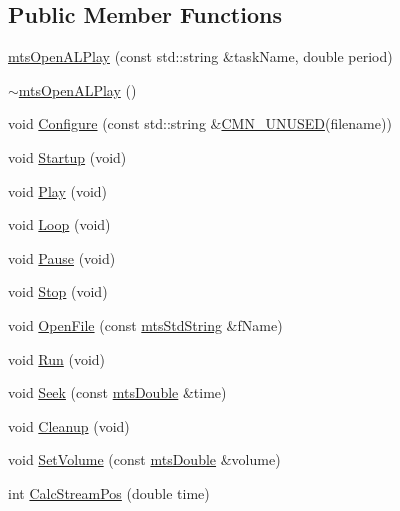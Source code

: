 \subsection*{Public Member Functions}
\begin{DoxyCompactItemize}
\item 
\hyperlink{classmts_open_a_l_play_a8e3527efa2c1a03b3731b021b1014d45}{mts\-Open\-A\-L\-Play} (const std\-::string \&task\-Name, double period)
\item 
\hyperlink{classmts_open_a_l_play_a4cfd60bc8e3b374965a64efe849ea293}{$\sim$mts\-Open\-A\-L\-Play} ()
\item 
void \hyperlink{classmts_open_a_l_play_a50d5e6a0d10ed9ce6731610c8a90348d}{Configure} (const std\-::string \&\hyperlink{cmn_portability_8h_a021894e2626935fa2305434b1e893ff6}{C\-M\-N\-\_\-\-U\-N\-U\-S\-E\-D}(filename))
\item 
void \hyperlink{classmts_open_a_l_play_ad4768ed94873e5be69d2ecaa193d107d}{Startup} (void)
\item 
void \hyperlink{classmts_open_a_l_play_acaaddecf2b42166c43cc70a2dcb30979}{Play} (void)
\item 
void \hyperlink{classmts_open_a_l_play_a636e6ddc634dc16bd49f2eebd992addc}{Loop} (void)
\item 
void \hyperlink{classmts_open_a_l_play_a488f3c12f12b5b0958cde0a881bde27c}{Pause} (void)
\item 
void \hyperlink{classmts_open_a_l_play_a96a4fef394cc593f4bb04a4cfb35fa4a}{Stop} (void)
\item 
void \hyperlink{classmts_open_a_l_play_af255131cd0ce646d98776c1d1d3b9992}{Open\-File} (const \hyperlink{mts_generic_object_proxy_8h_adbc21bfbf98367e582bf8a263b7e711f}{mts\-Std\-String} \&f\-Name)
\item 
void \hyperlink{classmts_open_a_l_play_a2c0ee1fd77ccb0b7e67767aee82cd164}{Run} (void)
\item 
void \hyperlink{classmts_open_a_l_play_ac02d0cc13bd81a096a65e491b1f48b33}{Seek} (const \hyperlink{mts_generic_object_proxy_8h_a31e76b0190a8d3f9838626cd7b47bd75}{mts\-Double} \&time)
\item 
void \hyperlink{classmts_open_a_l_play_abbbe810a394249d4ace57219e477d4d5}{Cleanup} (void)
\item 
void \hyperlink{classmts_open_a_l_play_a04586bb0ae21370a801df27fb318aac6}{Set\-Volume} (const \hyperlink{mts_generic_object_proxy_8h_a31e76b0190a8d3f9838626cd7b47bd75}{mts\-Double} \&volume)
\item 
int \hyperlink{classmts_open_a_l_play_a12253c6e0047c62cbb992f95a4d901d3}{Calc\-Stream\-Pos} (double time)
\end{DoxyCompactItemize}
